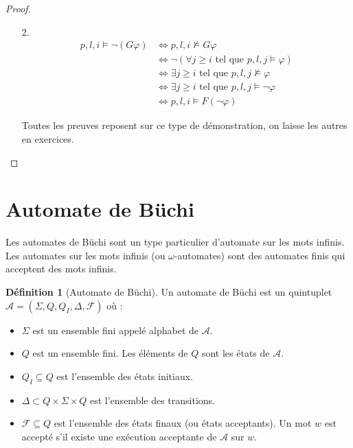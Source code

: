 \documentclass[12pt,a4paper]{article}
\theoremstyle{plain}
\theoremstyle{definition}
\newtheorem{defi}{Définition}
\begin{document}
\begin{proof}
	\leavevmode
	\begin{enumerate}
		\item[2.]
		\begin{align*}
			 p,l,i \models \lnot (G \varphi) &\Leftrightarrow p,l,i \not \models G \varphi \\
			 &\Leftrightarrow \lnot (\forall j \geq i\textrm{ tel que } p,l,j \models \varphi) \\
			 &\Leftrightarrow \exists j \geq i \textrm{ tel que } p,l,j \not \models \varphi \\
			 &\Leftrightarrow \exists j \geq i \textrm{ tel que } p,l,j \models \lnot \varphi \\
			 &\Leftrightarrow p,l,i \models F (\lnot \varphi)
		\end{align*}

		\item[] Toutes les preuves reposent sur ce type de démonstration, on laisse les autres en exercices.
	\end{enumerate}
\end{proof}



\section{Automate de Büchi}
Les automates de Büchi sont un type particulier d'automate sur les mots infinis.
Les automates sur les mots infinis (ou $\omega$-automates) sont des automates finis qui acceptent des mots infinis.

\begin{defi}[Automate de Büchi]
  Un automate de Büchi est un quintuplet $\mathcal{A}=(\Sigma, Q, Q_I, \Delta, \mathscr{F})$ où :
  \begin{itemize}
  \item $\Sigma$ est un ensemble fini appelé alphabet de $\mathcal{A}$.
  \item $Q$ est un ensemble fini. Les éléments de $Q$ sont les états de $\mathcal{A}$.
  \item $Q_I \subseteq Q$ est l'ensemble des états initiaux.
  \item $\Delta \subset Q \times \Sigma \times Q$ est l'ensemble des transitions.
  \item $\mathscr{F} \subseteq Q$ est l'ensemble des états finaux (ou états acceptants).
    Un mot $w$ est accepté s'il existe une exécution acceptante de $\mathcal{A}$ sur $w$.
  \end{itemize}
\end{defi}
\end{document}

